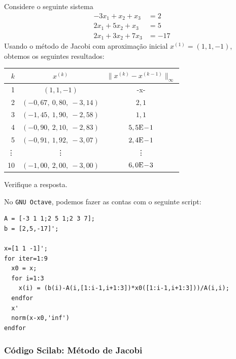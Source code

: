 \begin{ex}
  Considere o seguinte sistema
  \begin{equation}
    \begin{split}
      -3x_1 + x_2 + x_3 &= 2\\
      2x_1 + 5x_2 + x_3 &= 5\\
      2x_1 + 3x_2 + 7x_3 &= -17
    \end{split}
  \end{equation}
Usando o método de Jacobi com aproximação inicial $x^{(1)} = (1, 1, -1)$, obtemos os seguintes resultados:
\begin{center}
  \begin{tabular}{rcc}\hline
    $k$ & $x^{(k)}$ & $\|x^{(k)}-x^{(k-1)}\|_\infty$\\\hline
    1   & $(1, 1, -1)$ & -x-\\
    2   & $(-0,67,~0,80,~-3,14)$ & $2,1$\\
    3   & $(-1,45,~1,90,~-2,58)$ & $1,1$\\
    4   & $(-0,90,~2,10,~-2,83)$ & $5,5\mathrm{E}\!-\!1$\\
    5   & $(-0,91,~1,92,~-3,07)$ & $2,4\mathrm{E}\!-\!1$\\
    \vdots & \vdots & \vdots\\
    10  & $(-1,00,~2,00,~-3,00)$ & $6,0\mathrm{E}\!-\!3$\\\hline 
  \end{tabular}
\end{center}
Verifique a resposta.

\ifisscilab
\construirScilab
\fi
\ifisoctave
No \verb+GNU Octave+, podemos fazer as contas com o seguinte script:
\begin{verbatim}
A = [-3 1 1;2 5 1;2 3 7];
b = [2,5,-17]';

x=[1 1 -1]';
for iter=1:9
  x0 = x;
  for i=1:3
    x(i) = (b(i)-A(i,[1:i-1,i+1:3])*x0([1:i-1,i+1:3]))/A(i,i);
  endfor
  x'
  norm(x-x0,'inf')
endfor
\end{verbatim}
\fi
\ifispython
\construirPython
\fi
\end{ex}

\ifisscilab
\subsubsection{Código Scilab: Método de Jacobi}

